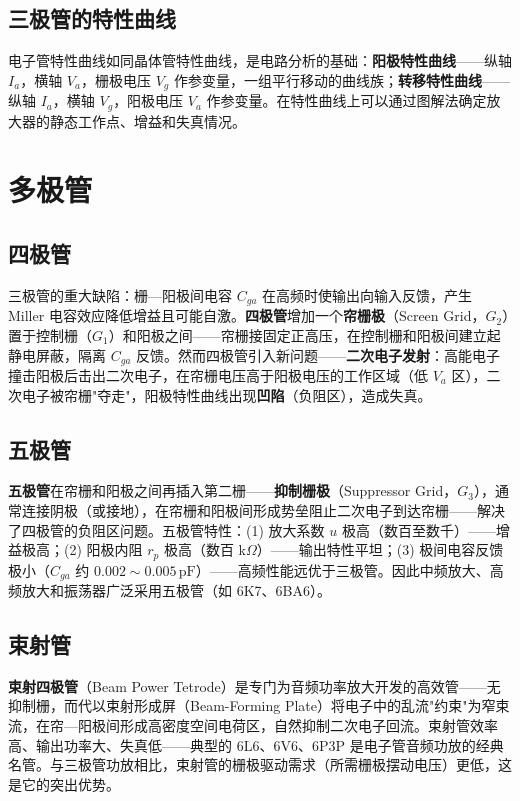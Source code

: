 \documentclass[12pt,UTF8]{ctexbook}
\begin{document}
\subsection{三极管的特性曲线}

电子管特性曲线如同晶体管特性曲线，是电路分析的基础：\textbf{阳极特性曲线}——纵轴 $I_a$，横轴 $V_a$，栅极电压 $V_g$ 作参变量，一组平行移动的曲线族；\textbf{转移特性曲线}——纵轴 $I_a$，横轴 $V_g$，阳极电压 $V_a$ 作参变量。在特性曲线上可以通过图解法确定放大器的静态工作点、增益和失真情况。

\section{多极管}
\label{sec:tube_multi_electrode}

\subsection{四极管}

三极管的重大缺陷：栅—阳极间电容 $C_{ga}$ 在高频时使输出向输入反馈，产生 Miller 电容效应降低增益且可能自激。\textbf{四极管}增加一个\textbf{帘栅极}（Screen Grid，$G_2$）置于控制栅（$G_1$）和阳极之间——帘栅接固定正高压，在控制栅和阳极间建立起静电屏蔽，隔离 $C_{ga}$ 反馈。然而四极管引入新问题——\textbf{二次电子发射}：高能电子撞击阳极后击出二次电子，在帘栅电压高于阳极电压的工作区域（低 $V_a$ 区），二次电子被帘栅"夺走"，阳极特性曲线出现\textbf{凹陷}（负阻区），造成失真。

\subsection{五极管}

\textbf{五极管}在帘栅和阳极之间再插入第二栅——\textbf{抑制栅极}（Suppressor Grid，$G_3$），通常连接阴极（或接地），在帘栅和阳极间形成势垒阻止二次电子到达帘栅——解决了四极管的负阻区问题。五极管特性：(1) 放大系数 $u$ 极高（数百至数千）——增益极高；(2) 阳极内阻 $r_p$ 极高（数百 k$\Omega$）——输出特性平坦；(3) 极间电容反馈极小（$C_{ga}$ 约 $0.002\sim0.005\,\mathrm{pF}$）——高频性能远优于三极管。因此中频放大、高频放大和振荡器广泛采用五极管（如 6K7、6BA6）。

\subsection{束射管}

\textbf{束射四极管}（Beam Power Tetrode）是专门为音频功率放大开发的高效管——无抑制栅，而代以束射形成屏（Beam-Forming Plate）将电子中的乱流"约束"为窄束流，在帘—阳极间形成高密度空间电荷区，自然抑制二次电子回流。束射管效率高、输出功率大、失真低——典型的 6L6、6V6、6P3P 是电子管音频功放的经典名管。与三极管功放相比，束射管的栅极驱动需求（所需栅极摆动电压）更低，这是它的突出优势。
\end{document}

